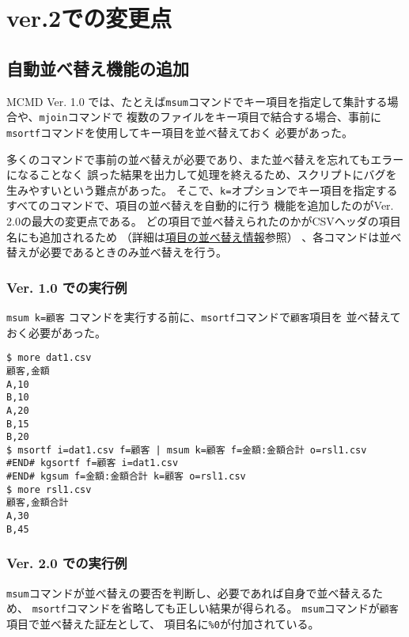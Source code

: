 
%

\section{ver.2での変更点\label{sect:changes}}
\subsection{自動並べ替え機能の追加}

MCMD Ver. 1.0 では、たとえば\verb|msum|コマンドでキー項目を指定して集計する場合や、\verb|mjoin|コマンドで
複数のファイルをキー項目で結合する場合、事前に\verb|msortf|コマンドを使用してキー項目を並べ替えておく
必要があった。

多くのコマンドで事前の並べ替えが必要であり、また並べ替えを忘れてもエラーになることなく
誤った結果を出力して処理を終えるため、スクリプトにバグを生みやすいという難点があった。
そこで、\verb|k=|オプションでキー項目を指定するすべてのコマンドで、項目の並べ替えを自動的に行う
機能を追加したのがVer. 2.0の最大の変更点である。
どの項目で並べ替えられたのかがCSVヘッダの項目名にも追加されるため
（詳細は\hyperref[sect:csv_sort]{項目の並べ替え情報}参照）
、各コマンドは並べ替えが必要であるときのみ並べ替えを行う。

\subsubsection*{Ver. 1.0 での実行例}

\verb|msum k=顧客| コマンドを実行する前に、\verb|msortf|コマンドで\verb|顧客|項目を
並べ替えておく必要があった。

\begin{Verbatim}[baselinestretch=0.7,frame=single]
$ more dat1.csv
顧客,金額
A,10
B,10
A,20
B,15
B,20
$ msortf i=dat1.csv f=顧客 | msum k=顧客 f=金額:金額合計 o=rsl1.csv
#END# kgsortf f=顧客 i=dat1.csv
#END# kgsum f=金額:金額合計 k=顧客 o=rsl1.csv
$ more rsl1.csv
顧客,金額合計
A,30
B,45
\end{Verbatim}

\subsubsection*{Ver. 2.0 での実行例}

\verb|msum|コマンドが並べ替えの要否を判断し、必要であれば自身で並べ替えるため、
\verb|msortf|コマンドを省略しても正しい結果が得られる。
\verb|msum|コマンドが\verb|顧客|項目で並べ替えた証左として、
項目名に\verb|%0|が付加されている。


